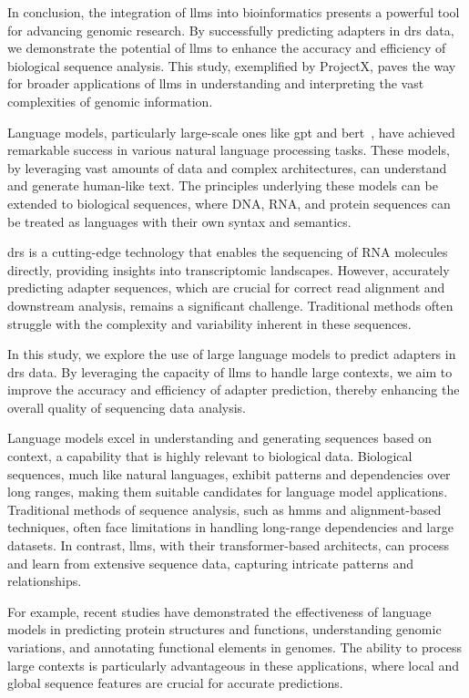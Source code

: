 \documentclass[pdflatex, sn-mathphys-num, lineno]{sn-jnl}%
\newcommand{\chopper}{ProjectX\xspace}
\theoremstyle{thmstyleone}%
\theoremstyle{thmstyletwo}%
\theoremstyle{thmstylethree}%
\begin{document}
In conclusion, the integration of \glspl{llm} into bioinformatics presents a powerful tool for advancing genomic research.
By successfully predicting adapters in \gls{drs} data, we demonstrate the potential of \glspl{llm} to enhance the accuracy and efficiency of biological sequence analysis.
This study, exemplified by \chopper, paves the way for broader applications of \glspl{llm} in understanding and interpreting the vast complexities of genomic information.

Language models, particularly large-scale ones like \gls{gpt} and \gls{bert}~\cite{devlin2018bert}, have achieved remarkable success in various natural language processing tasks.
These models, by leveraging vast amounts of data and complex architectures, can understand and generate human-like text.
The principles underlying these models can be extended to biological sequences, where DNA, RNA, and protein sequences can be treated as languages with their own syntax and semantics.

\gls{drs} is a cutting-edge technology that enables the sequencing of RNA molecules directly, providing insights into transcriptomic landscapes.
However, accurately predicting adapter sequences, which are crucial for correct read alignment and downstream analysis, remains a significant challenge.
Traditional methods often struggle with the complexity and variability inherent in these sequences.

In this study, we explore the use of large language models to predict adapters in \gls{drs} data.
By leveraging the capacity of \glspl{llm} to handle large contexts, we aim to improve the accuracy and efficiency of adapter prediction, thereby enhancing the overall quality of sequencing data analysis.


Language models excel in understanding and generating sequences based on context, a capability that is highly relevant to biological data.
Biological sequences, much like natural languages, exhibit patterns and dependencies over long ranges, making them suitable candidates for language model applications.
Traditional methods of sequence analysis, such as \glspl{hmm} and alignment-based techniques, often face limitations in handling long-range dependencies and large datasets.
In contrast, \glspl{llm}, with their transformer-based architects, can process and learn from extensive sequence data, capturing intricate patterns and relationships.

For example, recent studies have demonstrated the effectiveness of language models in predicting protein structures and functions, understanding genomic variations, and annotating functional elements in genomes.
The ability to process large contexts is particularly advantageous in these applications, where local and global sequence features are crucial for accurate predictions.
\end{document}
